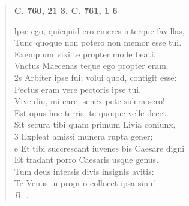 \documentclass[11pt, a4paper]{report}
\begin{document}
\begin{verse}
    \begin{center} \textbf{C. 760, 21 3. C. 761, 1 6} \end{center} \marginpar{[243]} lpse ego, quicquid ero cineres interque favillas, \\ Tunc quoque non potero non memor esse tui. \\ Exemplum vixi te propter molle beati, \\ Vnctus Maecenas teque ego propter eram. \\ 2s Arbiter ipse fui; volui quod, contigit esse: \\ Pectus eram vere pectoris ipse tui. \\ Vive diu, mi care, senex pete sidera sero! \\ Est opus hoc terris: te quoque velle decet. \\ Sit secura tibi quam primum Livia coniunx, \\ 3 Expleat amissi munera rupta gener; \\ e Et tibi succrescant iuvenes bis Caesare digni \\ Et tradant porro Caesaris usque genus. \\ Tum deus intersis divis insignis avitis: \\ Te Venus in proprio collocet ipsa sinu.’ \\ \textit{B. .} \\ 
      \end{verse}
  
\end{document}
